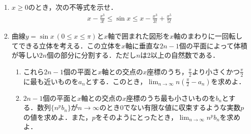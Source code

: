 \begin{enumerate}
  \item $x\ge 0$のとき，次の不等式を示せ．
        \begin{align*}
          x-\frac{x^3}{3!}\le \sin x \le  x-\frac{x^3}{3!}+\frac{x^5}{5!}
        \end{align*}
  \item 曲線$y=\sin x\, (0\le x\le \pi)$と$x$軸で囲まれた図形を$x$軸のまわりに一回転してできる立体を考える．この立体を$x$軸に垂直な$2n-1$個の平面によって体積が等しい$2n$個の部分に分割する．ただし$n$は2以上の自然数である．
        \begin{enumerate}
          \item これら$2n-1$個の平面と$x$軸との交点の$x$座標のうち，$\frac{\pi}{2}$より小さくかつ$\frac{\pi}{2}$に最も近いものを$a_n$とする．このとき，$\lim_{n\to\infty} n(\frac{\pi}{2}-a_n)$を求めよ．
          \item $2n-1$個の平面と$x$軸との交点の$x$座標のうち最も小さいものを$b_n$とする．数列$\{n^pb_n\}$が$n\to\infty$のとき$0$でない有限な値に収束するような実数$p$の値を求めよ．また，$p$をそのようにとったとき，$\lim_{n\to\infty}n^pb_n$を求めよ．
        \end{enumerate}
\end{enumerate}
